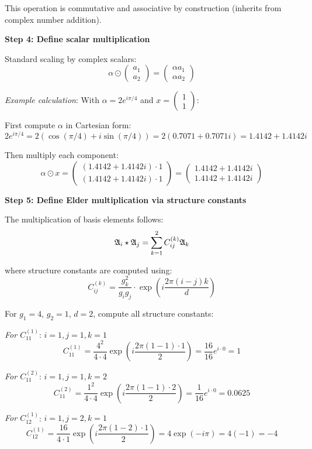 \begin{example}
This operation is commutative and associative by construction (inherits from complex number addition).

\textbf{Step 4: Define scalar multiplication}

Standard scaling by complex scalars:
$$\alpha \odot \begin{pmatrix} a_1 \\ a_2 \end{pmatrix} = \begin{pmatrix} \alpha a_1 \\ \alpha a_2 \end{pmatrix}$$

\textit{Example calculation}: With $\alpha = 2e^{i\pi/4}$ and $x = \begin{pmatrix} 1 \\ 1 \end{pmatrix}$:

First compute $\alpha$ in Cartesian form:
$$2e^{i\pi/4} = 2(\cos(\pi/4) + i\sin(\pi/4)) = 2(0.7071 + 0.7071i) = 1.4142 + 1.4142i$$

Then multiply each component:
$$\alpha \odot x = \begin{pmatrix} (1.4142 + 1.4142i) \cdot 1 \\ (1.4142 + 1.4142i) \cdot 1 \end{pmatrix} = \begin{pmatrix} 1.4142 + 1.4142i \\ 1.4142 + 1.4142i \end{pmatrix}$$

\textbf{Step 5: Define Elder multiplication via structure constants}

The multiplication of basis elements follows:
$$\mathfrak{A}_{i} \star \mathfrak{A}_{j} = \sum_{k=1}^{2} C_{ij}^{(k)} \mathfrak{A}_{k}$$

where structure constants are computed using:
$$C_{ij}^{(k)} = \frac{g_k^2}{g_i g_j} \cdot \exp\left(i\frac{2\pi(i-j)k}{d}\right)$$

For $g_1 = 4$, $g_2 = 1$, $d = 2$, compute all structure constants:

\textit{For $C_{11}^{(1)}$}: $i=1, j=1, k=1$
$$C_{11}^{(1)} = \frac{4^2}{4 \cdot 4} \exp\left(i\frac{2\pi(1-1) \cdot 1}{2}\right) = \frac{16}{16} e^{i \cdot 0} = 1$$

\textit{For $C_{11}^{(2)}$}: $i=1, j=1, k=2$
$$C_{11}^{(2)} = \frac{1^2}{4 \cdot 4} \exp\left(i\frac{2\pi(1-1) \cdot 2}{2}\right) = \frac{1}{16} e^{i \cdot 0} = 0.0625$$

\textit{For $C_{12}^{(1)}$}: $i=1, j=2, k=1$
$$C_{12}^{(1)} = \frac{16}{4 \cdot 1} \exp\left(i\frac{2\pi(1-2) \cdot 1}{2}\right) = 4 \exp(-i\pi) = 4(-1) = -4$$


\end{example}
